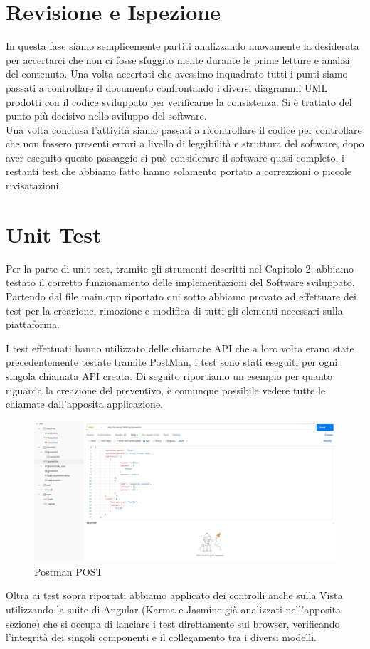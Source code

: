 \documentclass[a4paper, 11pt,oneside]{book}
\newcommand{\spacing}{\par\bigskip\noindent}
\begin{document}
    \section{Revisione e Ispezione}
        In questa fase siamo semplicemente partiti analizzando nuovamente la desiderata per accertarci che non ci fosse sfuggito niente durante le prime letture e analisi del contenuto. Una volta accertati che avessimo inquadrato tutti i punti siamo passati a controllare il documento
        confrontando i diversi diagrammi UML prodotti con il codice sviluppato per verificarne la consistenza. Si è trattato del punto più decisivo nello sviluppo del software.\\
        Una volta conclusa l'attività siamo passati a ricontrollare il codice per controllare che non fossero presenti errori a livello di leggibilità e struttura del software, dopo aver eseguito questo passaggio si può considerare il software quasi completo, i restanti test che abbiamo fatto
        hanno solamento portato a correzzioni o piccole rivisatazioni
    \section{Unit Test}
        Per la parte di unit test, tramite gli strumenti descritti nel Capitolo 2, abbiamo testato il corretto funzionamento delle implementazioni del Software sviluppato. Partendo dal file main.cpp riportato qui sotto abbiamo provato ad effettuare dei test per la creazione, rimozione e modifica di tutti gli elementi
        necessari sulla piattaforma.
        \spacing
        
        \spacing
        I test effettuati hanno utilizzato delle chiamate API che a loro volta erano state precedentemente testate tramite PostMan, i test sono stati eseguiti per ogni singola chiamata API creata. Di seguito riportiamo un esempio per quanto riguarda la creazione del preventivo, è comunque possibile vedere
        tutte le chiamate dall'apposita applicazione.
        \begin{figure}[H]
            \includegraphics[width=\textwidth]{Postman_POST.jpeg}
            \caption{Postman POST}
            \label{fig:postman_post}
        \end{figure}
        \spacing
        Oltra ai test sopra riportati abbiamo applicato dei controlli anche sulla Vista utilizzando la suite di Angular (Karma e Jasmine già analizzati nell'apposita sezione) che si occupa di lanciare i test direttamente sul browser, verificando l'integrità dei singoli componenti e il collegamento tra
        i diversi modelli.
\end{document}
